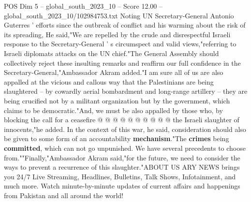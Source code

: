 \begin{textsample}{POS Dim 5 – global\_south\_2023\_10 – Score 12.00 – global\_south\_2023\_10/102984753.txt}
Noting UN Secretary-General Antonio Guterres ' efforts since the outbreak of conflict and his warming about the risk of its spreading, He said,"We are repelled by the crude and disrespectful Israeli response to the Secretary-General ' s circumspect and valid views,"referring to Israeli diplomats attacks on the UN chief."The General Assembly should collectively reject these insulting remarks and reaffirm our full confidence in the Secretary-General,"Ambassador Akram added."I am sure all of us are also appalled at the vicious and callous way that the Palestinians are being slaughtered -- by cowardly aerial bombardment and long-range artillery -- they are being crucified not by a militant organization but by the government, which claims to be democratic."And, we must be also appalled by those who, by blocking the call for a ceasefire @ @ @ @ @ @ @ @ @ @ the Israeli slaughter of innocents,"he added.
In the context of this war, he said, consideration should also be given to some form of an accountability \textbf{mechanism}."The \textbf{crimes} being \textbf{committed}, which can not go unpunished.
We have several precedents to choose from.""Finally,"Ambassador Akram said,"for the future, we need to consider the ways to prevent a recurrence of this slaughter."ABOUT US ARY NEWS brings you 24/7 Live Streaming, Headlines, Bulletins, Talk Shows, Infotainment, and much more.
Watch minute-by-minute updates of current affairs and happenings from Pakistan and all around the world!

\end{textsample}
